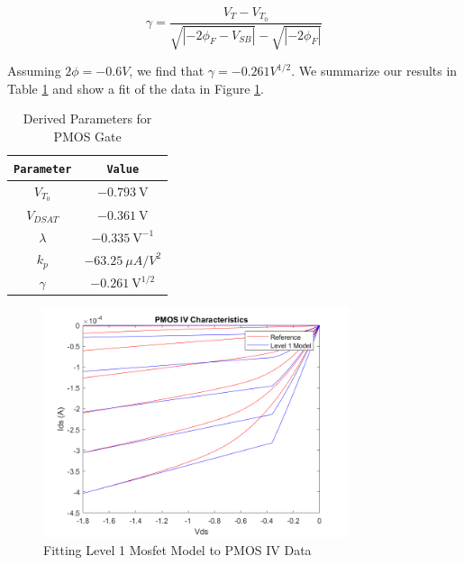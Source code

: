 \documentclass[fleqn]{article}
\begin{document}
	\begin{equation}
		\gamma = \frac{V_T - V_{T_0}}{\sqrt{|-2\phi_F - V_{SB}|} - {\sqrt{|-2\phi_F|}}} 
	\end{equation}
	
	\noindent Assuming $2\phi = -0.6 V$, we find that $\gamma = -0.261 V^{1/2}$. We summarize our results in Table \ref{table::pmos_derived_params} and show a fit of the data in Figure \ref{fig::pmos_iv_fit}.
	
	\begin{table}[H]
	\begin{center}
	\caption{Derived Parameters for PMOS Gate}
	\label{table::pmos_derived_params}
	\begin{tabular}{| c | c |}
		\hline
		\texttt{Parameter} & \texttt{Value}\\
		\hline	
		$V_{T_0}$ & $-0.793\ \text{V}$ \\
		\hline	
		$V_{DSAT}$ & $-0.361\ \text{V}$ \\
		\hline	
		$\lambda$ & $-0.335\ \text{V}^{-1}$\\
		\hline	
		$k_p$ & $-63.25\ {\mu}A/V^2$\\
		\hline	
		$\gamma$ & $-0.261\ \text{V}^{1/2}$\\
		\hline
	\end{tabular}
	\end{center}
	\end{table}
	
	\begin{figure}[H]
		\centerline{\includegraphics[width=0.8\textwidth]{pmos_iv_fit.png}}
		\caption{Fitting Level 1 Mosfet Model to PMOS IV Data}
		\label{fig::pmos_iv_fit}
	\end{figure}
\end{document}
